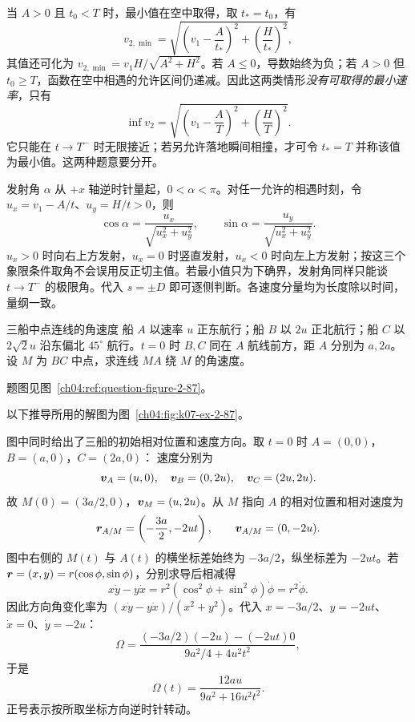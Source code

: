 {\begin{xesolution}
当 $A>0$ 且 $t_0<T$ 时，最小值在空中取得，取 $t_*=t_0$，有
\[
\boxed{v_{2,\min}=\sqrt{\left(v_1-\frac{A}{t_*}\right)^2+\left(\frac H{t_*}\right)^2}},
\]
其值还可化为 $v_{2,\min}=v_1H/\sqrt{A^2+H^2}$。若 $A\le0$，导数始终为负；若 $A>0$ 但 $t_0\ge T$，函数在空中相遇的允许区间仍递减。因此这两类情形\emph{没有可取得的最小速率}，只有
\[
\boxed{\inf v_2=\sqrt{\left(v_1-\frac A T\right)^2+\left(\frac H T\right)^2}}.
\]
它只能在 $t\to T^-$ 时无限接近；若另允许落地瞬间相撞，才可令 $t_*=T$ 并称该值为最小值。这两种题意要分开。

发射角 $\alpha$ 从 $+x$ 轴逆时针量起，$0<\alpha<\pi$。对任一允许的相遇时刻，令 $u_x=v_1-A/t$、$u_y=H/t>0$，则
\[
\cos\alpha=\frac{u_x}{\sqrt{u_x^2+u_y^2}},\qquad
\sin\alpha=\frac{u_y}{\sqrt{u_x^2+u_y^2}}.
\]
$u_x>0$ 时向右上方发射，$u_x=0$ 时竖直发射，$u_x<0$ 时向左上方发射；按这三个象限条件取角不会误用反正切主值。若最小值只为下确界，发射角同样只能谈 $t\to T^-$ 的极限角。代入 $s=\pm D$ 即可逐侧判断。各速度分量均为长度除以时间，量纲一致。
\end{xesolution}

\begin{origexamplebox}{三船中点连线的角速度}\label{ch04:ex:k07-2-87}
船 $A$ 以速率 $u$ 正东航行；船 $B$ 以 $2u$ 正北航行；船 $C$ 以 $2\sqrt2u$ 沿东偏北 $45^\circ$ 航行。$t=0$ 时 $B,C$ 同在 $A$ 航线前方，距 $A$ 分别为 $a,2a$。设 $M$ 为 $BC$ 中点，求连线 $MA$ 绕 $M$ 的角速度。
\par 题图见图~\ref{ch04:ref:question-figure-2-87}。
\KQuestionDJ
\end{origexamplebox}
\begin{xesolution}
以下推导所用的解图为图~\ref{ch04:fig:k07-ex-2-87}。

图中同时给出了三船的初始相对位置和速度方向。取 $t=0$ 时 $A=(0,0)$，$B=(a,0)$，$C=(2a,0)$：
\ThreeBoatsDiagram
速度分别为
\[
\bm{v}_A=(u,0),\quad\bm{v}_B=(0,2u),\quad\bm{v}_C=(2u,2u).
\]
故 $M(0)=(3a/2,0)$，$\bm{v}_M=(u,2u)$。从 $M$ 指向 $A$ 的相对位置和相对速度为
\[
\bm{r}_{A/M}=\left(-\frac{3a}{2},-2ut\right),\qquad
\bm{v}_{A/M}=(0,-2u).
\]
图中右侧的 $M(t)$ 与 $A(t)$ 的横坐标差始终为 $-3a/2$，纵坐标差为 $-2ut$。若 $\bm{r}=(x,y)=r(\cos\phi,\sin\phi)$，分别求导后相减得
\[
x\dot y-y\dot x
=r^2(\cos^2\phi+\sin^2\phi)\dot\phi=r^2\dot\phi.
\]
因此方向角变化率为 $(x\dot y-y\dot x)/(x^2+y^2)$。代入 $x=-3a/2$、$y=-2ut$、$\dot x=0$、$\dot y=-2u$：
\[
\Omega=\frac{(-3a/2)(-2u)-(-2ut)0}{9a^2/4+4u^2t^2},
\]
于是
\[
\boxed{\Omega(t)=\frac{12au}{9a^2+16u^2t^2}}.
\]
正号表示按所取坐标方向逆时针转动。
\end{xesolution}

}
